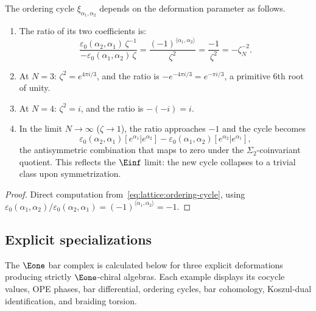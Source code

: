 \begin{proposition}
\label{prop:lattice:ordering-cycle-phase}
The ordering cycle $\xi_{\alpha_1,\alpha_2}$ depends on the
deformation parameter as follows.
\begin{enumerate}[label=(\roman*)]
\item The ratio of its two coefficients is:
\begin{equation}\label{eq:lattice:cycle-ratio}
\frac{\varepsilon_0(\alpha_2,\alpha_1)\,\zeta^{-1}}%
 {-\varepsilon_0(\alpha_1,\alpha_2)\,\zeta}
= \frac{(-1)^{\langle\alpha_1,\alpha_2\rangle}}{\zeta^2}
= \frac{-1}{\zeta^2}
= -\zeta_N^{-2}.
\end{equation}
\item At $N = 3$: $\zeta^2 = e^{4\pi i/3}$, and the ratio is
 $-e^{-4\pi i/3} = e^{-\pi i/3}$, a primitive 6th root of unity.
\item At $N = 4$: $\zeta^2 = i$, and the ratio is $-(-i) = i$.
\item In the limit $N \to \infty$ \textup{(}$\zeta \to 1$\textup{)},
 the ratio approaches $-1$ and the cycle becomes
 \[
 \varepsilon_0(\alpha_2,\alpha_1)[e^{\alpha_1}|e^{\alpha_2}]
 - \varepsilon_0(\alpha_1,\alpha_2)[e^{\alpha_2}|e^{\alpha_1}],
 \]
 the antisymmetric combination that maps to
 zero under the $\Sigma_2$-coinvariant quotient.
 This reflects the $\Einf$ limit: the new cycle collapses to a
 trivial class upon symmetrization.
\end{enumerate}
\end{proposition}

\begin{proof}
Direct computation from~\eqref{eq:lattice:ordering-cycle}, using
$\varepsilon_0(\alpha_1,\alpha_2)/\varepsilon_0(\alpha_2,\alpha_1)
= (-1)^{\langle\alpha_1,\alpha_2\rangle} = -1$.
\end{proof}


\subsection{Explicit specializations}
\label{sec:lattice:explicit-e1}

The $\Eone$ bar complex is calculated below for three explicit
deformations producing strictly $\Eone$-chiral algebras. Each example
displays its cocycle values, OPE phases, bar differential, ordering
cycles, bar cohomology, Koszul-dual identification, and braiding
torsion.

